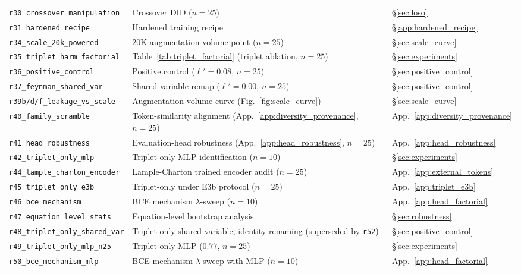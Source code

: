 \begin{center}
\begin{tabular}{@{}p{}p{}p{}@{}}
\texttt{r30\_crossover\_manipulation} & Crossover DID ($n{=}25$) & \S\ref{sec:loso} \\
\texttt{r31\_hardened\_recipe} & Hardened training recipe & \S\ref{app:hardened_recipe} \\
\texttt{r34\_scale\_20k\_powered} & 20K augmentation-volume point ($n{=}25$) & \S\ref{sec:scale_curve} \\
\texttt{r35\_triplet\_harm\_factorial} & Table~\ref{tab:triplet_factorial} (triplet ablation, $n{=}25$) & \S\ref{sec:experiments} \\
\texttt{r36\_positive\_control} & Positive control ($\ell'{=}0.08$, $n{=}25$) & \S\ref{sec:positive_control} \\
\texttt{r37\_feynman\_shared\_var} & Shared-variable remap ($\ell'{=}0.00$, $n{=}25$) & \S\ref{sec:positive_control} \\
\texttt{r39b/d/f\_leakage\_vs\_scale} & Augmentation-volume curve (Fig.~\ref{fig:scale_curve}) & \S\ref{sec:scale_curve} \\
\texttt{r40\_family\_scramble} & Token-similarity alignment (App.~\ref{app:diversity_provenance}, $n{=}25$) & App.~\ref{app:diversity_provenance} \\
\texttt{r41\_head\_robustness} & Evaluation-head robustness (App.~\ref{app:head_robustness}, $n{=}25$) & App.~\ref{app:head_robustness} \\
\texttt{r42\_triplet\_only\_mlp} & Triplet-only MLP identification ($n{=}10$) & \S\ref{sec:experiments} \\
\texttt{r44\_lample\_charton\_encoder} & Lample-Charton trained encoder audit ($n{=}25$) & App.~\ref{app:external_tokens} \\
\texttt{r45\_triplet\_only\_e3b} & Triplet-only under E3b protocol ($n{=}25$) & App.~\ref{app:triplet_e3b} \\
\texttt{r46\_bce\_mechanism} & BCE mechanism $\lambda$-sweep ($n{=}10$) & App.~\ref{app:head_factorial} \\
\texttt{r47\_equation\_level\_stats} & Equation-level bootstrap analysis & \S\ref{sec:robustness} \\
\texttt{r48\_triplet\_only\_shared\_var} & Triplet-only shared-variable, identity-renaming (superseded by \texttt{r52}) & \S\ref{sec:positive_control} \\
\texttt{r49\_triplet\_only\_mlp\_n25} & Triplet-only MLP ($0.77$, $n{=}25$) & \S\ref{sec:experiments} \\
\texttt{r50\_bce\_mechanism\_mlp} & BCE mechanism $\lambda$-sweep with MLP ($n{=}10$) & App.~\ref{app:head_factorial} \\

\end{tabular}
\end{center}
